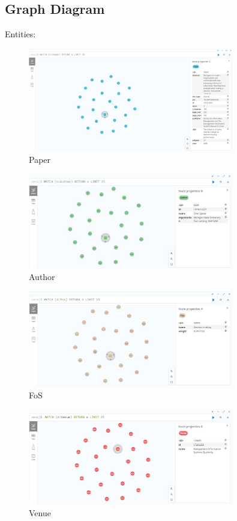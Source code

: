 \documentclass{Configuration_Files/PoliMi3i_thesis}
\begin{document}
\subsection{Graph Diagram}
Entities:
 \begin{figure}[H]
    \centering
     \includegraphics[width=0.8\textwidth]{Images/data/Paper.jpg}
    \caption{Paper}
    \label{fig:quadtree}
\end{figure}
    \begin{figure}[H]
    \centering
    \includegraphics[width=0.8\textwidth]{Images/data/Author.jpg}
    \caption{Author}
    \label{fig:quadtree}
\end{figure}
\begin{figure}[H]
    \centering
    \includegraphics[width=0.8\textwidth]{Images/data/Fos.jpg}
    \caption{FoS}
    \label{fig:quadtree}
\end{figure}
\begin{figure}[H]
    \centering
    \includegraphics[width=0.8\textwidth]{Images/data/Venue.jpg}
    \caption{Venue}
    \label{fig:quadtree}
\end{figure}
  
\end{document}
